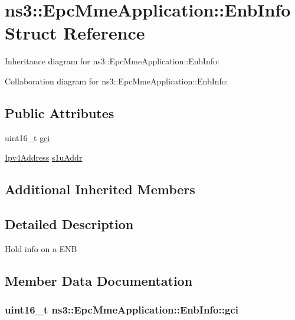 \hypertarget{structns3_1_1EpcMmeApplication_1_1EnbInfo}{}\section{ns3\+:\+:Epc\+Mme\+Application\+:\+:Enb\+Info Struct Reference}
\label{structns3_1_1EpcMmeApplication_1_1EnbInfo}


Inheritance diagram for ns3\+:\+:Epc\+Mme\+Application\+:\+:Enb\+Info\+:


Collaboration diagram for ns3\+:\+:Epc\+Mme\+Application\+:\+:Enb\+Info\+:
\subsection*{Public Attributes}
\begin{DoxyCompactItemize}
\item 
uint16\+\_\+t \hyperlink{structns3_1_1EpcMmeApplication_1_1EnbInfo_abe85e4e17491511aac80c781532e14a4}{gci}
\item 
\hyperlink{classns3_1_1Ipv4Address}{Ipv4\+Address} \hyperlink{structns3_1_1EpcMmeApplication_1_1EnbInfo_ab5d4b2e41f685a4bcac968da0eda1fa1}{s1u\+Addr}
\end{DoxyCompactItemize}
\subsection*{Additional Inherited Members}


\subsection{Detailed Description}
Hold info on a E\+NB 

\subsection{Member Data Documentation}
\subsubsection[{\texorpdfstring{gci}{gci}}]{\setlength{\rightskip}{0pt plus 5cm}uint16\+\_\+t ns3\+::\+Epc\+Mme\+Application\+::\+Enb\+Info\+::gci}\hypertarget{structns3_1_1EpcMmeApplication_1_1EnbInfo_abe85e4e17491511aac80c781532e14a4}{}\label{structns3_1_1EpcMmeApplication_1_1EnbInfo_abe85e4e17491511aac80c781532e14a4}
